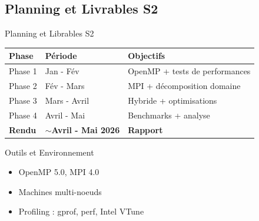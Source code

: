 \documentclass[aspectratio=169]{beamer}
\begin{document}
\subsection{Planning et Livrables S2}
\begin{frame}{Planning et Librables S2}
    \begin{table}
        \centering
        \small
        \begin{tabular}{@{}lll@{}}
            \hline
            \textbf{Phase} & \textbf{Période} & \textbf{Objectifs} \\
            \hline
            Phase 1 & Jan - Fév & OpenMP + tests de performances \\
            Phase 2 & Fév - Mars & MPI + décomposition domaine \\
            Phase 3 & Mars - Avril & Hybride + optimisations \\
            Phase 4 & Avril - Mai & Benchmarks + analyse \\
            \hline
            \textbf{Rendu} & \textbf{$\sim$Avril - Mai 2026} & \textbf{Rapport} \\
            \hline
        \end{tabular}
    \end{table}
    \vspace{0.3cm}
    \begin{block}{Outils et Environnement}
        \begin{itemize}
            \item OpenMP 5.0, MPI 4.0
            \item Machines multi-noeuds
            \item Profiling : gprof, perf, Intel VTune
        \end{itemize}
    \end{block}
\end{frame}

\end{document}
